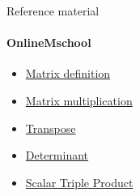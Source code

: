 \documentclass[aspectratio=169,notes]{beamer}
\newcommand{\fbckg}[1]{\usebackgroundtemplate{\texttt{[image: \#1]}}}%
\begin{document}
\begin{frame}[t]{Reference material}
    \framesubtitle{OnlineMschool}
    \Large
    \begin{itemize}
        \item \href{https://onlinemschool.com/math/library/matrix/definition/}{Matrix definition}
        \item \href{https://onlinemschool.com/math/library/matrix/multiply/}{Matrix multiplication}
        \item \href{https://onlinemschool.com/math/library/matrix/transpose/}{Transpose}
        \item \href{https://onlinemschool.com/math/library/matrix/determinant/}{Determinant}
        \item \href{https://onlinemschool.com/math/library/vector/multiply2/}{Scalar Triple Product}
    \end{itemize}
\end{frame}

\fbckg{fibeamer/figs/last_page.png}
\frame[plain]{}
\end{document}
